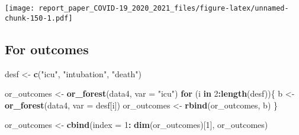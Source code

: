\documentclass[
]{article}
\newenvironment{Shaded}{\begin{snugshade}}{\end{snugshade}}
\newcommand{\ControlFlowTok}[1]{\textcolor[rgb]{0.13,0.29,0.53}{\textbf{#1}}}
\newcommand{\DataTypeTok}[1]{\textcolor[rgb]{0.13,0.29,0.53}{#1}}
\newcommand{\DecValTok}[1]{\textcolor[rgb]{0.00,0.00,0.81}{#1}}
\newcommand{\KeywordTok}[1]{\textcolor[rgb]{0.13,0.29,0.53}{\textbf{#1}}}
\newcommand{\NormalTok}[1]{#1}
\newcommand{\OperatorTok}[1]{\textcolor[rgb]{0.81,0.36,0.00}{\textbf{#1}}}
\newcommand{\StringTok}[1]{\textcolor[rgb]{0.31,0.60,0.02}{#1}}
\begin{document}
\texttt{[image: report\_paper\_COVID-19\_2020\_2021\_files/figure-latex/unnamed-chunk-150-1.pdf]}

\hypertarget{for-outcomes}{%
\subsection{For outcomes}\label{for-outcomes}}

\begin{Shaded}
\begin{Highlighting}[]
\NormalTok{desf <-}\StringTok{ }\KeywordTok{c}\NormalTok{(}\StringTok{"icu"}\NormalTok{, }\StringTok{"intubation"}\NormalTok{, }\StringTok{"death"}\NormalTok{)}

\NormalTok{or_outcomes <-}\StringTok{ }\KeywordTok{or_forest}\NormalTok{(data4, }\DataTypeTok{var =} \StringTok{"icu"}\NormalTok{)}
\ControlFlowTok{for}\NormalTok{ (i }\ControlFlowTok{in} \DecValTok{2}\OperatorTok{:}\KeywordTok{length}\NormalTok{(desf))\{}
\NormalTok{ b <-}\StringTok{ }\KeywordTok{or_forest}\NormalTok{(data4, }\DataTypeTok{var =}\NormalTok{ desf[i])}
\NormalTok{ or_outcomes <-}\StringTok{ }\KeywordTok{rbind}\NormalTok{(or_outcomes, b)}
\NormalTok{\}}

\NormalTok{or_outcomes <-}\StringTok{ }\KeywordTok{cbind}\NormalTok{(}\DataTypeTok{index =} \DecValTok{1}\OperatorTok{:}\StringTok{ }\KeywordTok{dim}\NormalTok{(or_outcomes)[}\DecValTok{1}\NormalTok{], or_outcomes)}


\end{Highlighting}
\end{Shaded}
\end{document}
